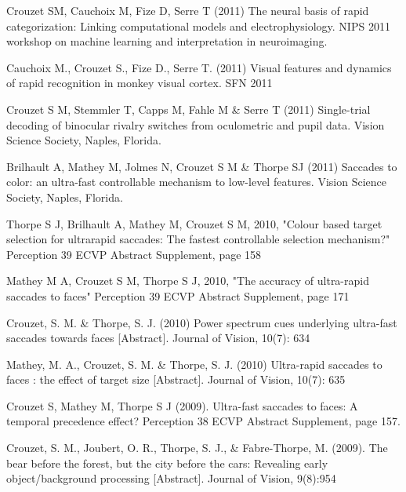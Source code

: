 \documentclass[margin,line]{resume}
\begin{document}
\begin{resume}
	\vspace{-2mm} Crouzet SM, Cauchoix M, Fize D, Serre T (2011) The neural basis of rapid categorization: Linking computational models and electrophysiology. NIPS 2011 workshop on machine learning and interpretation in neuroimaging.

	\vspace{-2mm} Cauchoix M., Crouzet S., Fize D., Serre T. (2011) Visual features and dynamics of rapid recognition in monkey visual cortex. SFN 2011

\newpage

	\vspace{-2mm} Crouzet S M, Stemmler T, Capps M, Fahle M \& Serre T (2011) Single-trial decoding of binocular rivalry switches from oculometric and pupil data. Vision Science Society, Naples, Florida.

	\vspace{-2mm} Brilhault A, Mathey M, Jolmes N, Crouzet S M \& Thorpe SJ (2011) Saccades to color: an ultra-fast controllable mechanism to low-level features. Vision Science Society, Naples, Florida.

	\vspace{-2mm} Thorpe S J, Brilhault A, Mathey M, Crouzet S M, 2010, "Colour based target selection for ultrarapid saccades: The fastest controllable selection mechanism?" Perception 39 ECVP Abstract Supplement, page 158

	\vspace{-2mm} Mathey M A, Crouzet S M, Thorpe S J, 2010, "The accuracy of ultra-rapid saccades to faces" Perception 39 ECVP Abstract Supplement, page 171

	\vspace{-2mm} Crouzet, S. M. \& Thorpe, S. J. (2010) Power spectrum cues underlying ultra-fast saccades towards faces [Abstract]. Journal of Vision, 10(7): 634

	\vspace{-2mm} Mathey, M. A., Crouzet, S. M. \& Thorpe, S. J. (2010) Ultra-rapid saccades to faces : the effect of target size [Abstract]. Journal of Vision, 10(7): 635

	\vspace{-2mm} Crouzet S, Mathey M, Thorpe S J (2009). Ultra-fast saccades to faces: A temporal precedence effect? Perception 38 ECVP Abstract Supplement, page 157.

	\vspace{-2mm} Crouzet, S. M., Joubert, O. R., Thorpe, S. J., \& Fabre-Thorpe, M. (2009). The bear before the forest, but the city before the cars: Revealing early object/background processing [Abstract]. Journal of Vision, 9(8):954


\end{resume}
\end{document}
